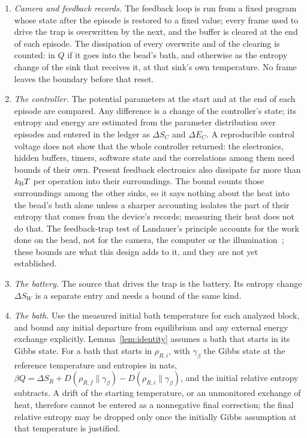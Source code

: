 \begin{enumerate}[label=(\alph*),leftmargin=*]
\item \emph{Camera and feedback records.} The feedback loop is run from a fixed program whose state after the episode is restored to a fixed value; every frame used to drive the trap is overwritten by the next, and the buffer is cleared at the end of each episode. The dissipation of every overwrite and of the clearing is counted: in $Q$ if it goes into the bead's bath, and otherwise as the entropy change of the sink that receives it, at that sink's own temperature. No frame leaves the boundary before that reset.
\item \emph{The controller.} The potential parameters at the start and at the end of each episode are compared. Any difference is a change of the controller's state; its entropy and energy are estimated from the parameter distribution over episodes and entered in the ledger as $\Delta S_C$ and $\Delta E_C$. A reproducible control voltage does not show that the whole controller returned: the electronics, hidden buffers, timers, software state and the correlations among them need bounds of their own. Present feedback electronics also dissipate far more than $k_{\mathrm B} T$ per operation into their surroundings. The bound counts those surroundings among the other sinks, so it says nothing about the heat into the bead's bath alone unless a sharper accounting isolates the part of their entropy that comes from the device's records; measuring their heat does not do that. The feedback-trap test of Landauer's principle accounts for the work done on the bead, not for the camera, the computer or the illumination~\cite{Jun14}; these bounds are what this design adds to it, and they are not yet established.
\item \emph{The battery.} The source that drives the trap is the battery. Its entropy change $\Delta S_W$ is a separate entry and needs a bound of the same kind.
\item \emph{The bath.} Use the measured initial bath temperature for each analyzed block, and bound any initial departure from equilibrium and any external energy exchange explicitly. Lemma~\ref{lem:identity} assumes a bath that starts in its Gibbs state. For a bath that starts in $\rho_{R,i}$, with $\gamma_\beta$ the Gibbs state at the reference temperature and entropies in nats, $\beta Q=\Delta S_R+D(\rho_{R,f}\|\gamma_\beta)-D(\rho_{R,i}\|\gamma_\beta)$, and the initial relative entropy subtracts. A drift of the starting temperature, or an unmonitored exchange of heat, therefore cannot be entered as a nonnegative final correction; the final relative entropy may be dropped only once the initially Gibbs assumption at that temperature is justified.
\end{enumerate}
